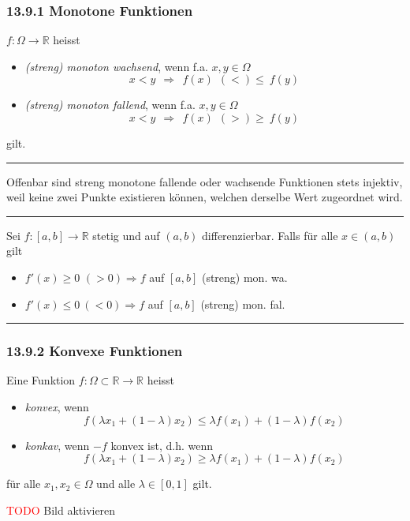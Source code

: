 \documentclass[a4paper,landscape,8pt]{extarticle}
\newcommand{\R}{\mathbb{R}}
\newcommand{\todo}{\textcolor{red}{TODO }}
\newcommand{\sep}{\vspace{5pt}\noindent\hrule\vspace{5pt}}
\begin{document}
\begin{multicols*}{4}
\subsubsection{13.9.1 Monotone Funktionen}

\Def $f\colon\Omega\to\R$ heisst
\begin{itemize}
  \item \emph{(streng) monoton wachsend}, wenn f.a. $x,y\in\Omega$
  \[
  	x < y  \ \ \Longrightarrow  \ \ f(x) \ \ (<)\leq \ f(y)
  \]
  \item \emph{(streng) monoton fallend}, wenn f.a. $x,y\in\Omega$
  \[
  	x < y  \ \ \Longrightarrow  \ \ f(x)\ \ (>)\geq \ f(y)
  \]
\end{itemize}
gilt.

\sep

\Satz Offenbar sind streng monotone fallende oder wachsende Funktionen stets
injektiv, weil keine zwei Punkte existieren können, welchen derselbe Wert
zugeordnet wird.

\sep

\Satz Sei $f\colon[a,b]\to\R$ stetig und auf $(a,b)$ differenzierbar. Falls für
alle $x\in(a,b)$ gilt
\begin{itemize}
  \item $f'(x)\geq 0$ $(>0) \Longrightarrow f$ auf
$[a,b]$ (streng) mon. wa.
\item $f'(x)\leq 0 \ (<0) \Longrightarrow f$ auf $[a,b]$ (streng) mon. fal.
\end{itemize}

\sep

\subsubsection{13.9.2 Konvexe Funktionen}

\Def Eine Funktion $f\colon \Omega\subset\R\to\R$ heisst 
\begin{itemize}
  \item \emph{konvex}, wenn
	\[
	f(\lambda x_1 + (1-\lambda)x_2) \leq \lambda f(x_1) + (1-\lambda)f(x_2)
	\]
	\item \emph{konkav}, wenn $-f$ konvex ist, d.h. wenn
	\[
	f(\lambda x_1 + (1-\lambda)x_2) \geq \lambda f(x_1) + (1-\lambda)f(x_2)
	\]
\end{itemize}
für alle $x_1,x_2\in\Omega$ und alle $\lambda\in[0,1]$ gilt.

\todo Bild aktivieren


\end{multicols*}
\end{document}
